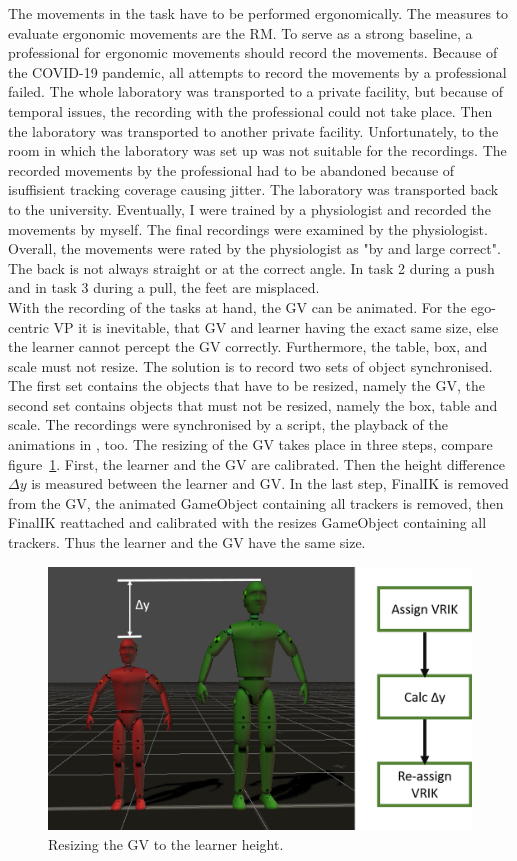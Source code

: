 The movements in the task have to be performed ergonomically. The measures to evaluate ergonomic movements are the RM. To serve as a strong baseline, a professional for ergonomic movements should record the movements. Because of the COVID-19 pandemic, all attempts to record the movements by a professional failed. The whole laboratory was transported to a private facility, but because of temporal issues, the recording with the professional could not take place. Then the laboratory was transported to another private facility. Unfortunately, to the room in which the laboratory was set up was not suitable for the recordings. The recorded movements by the professional had to be abandoned because of isuffisient tracking coverage causing jitter. The laboratory was transported back to the university. Eventually, I were trained by a physiologist and recorded the movements by myself. The final recordings were examined by the physiologist. Overall, the movements were rated by the physiologist as "by and large correct". The back is not always straight or at the correct angle. In task 2 during a push and in task 3 during a pull, the feet are misplaced.\\

With the recording of the tasks at hand, the GV can be animated. For the ego-centric VP it is inevitable, that GV and learner having the exact same size, else the learner cannot percept the GV correctly. Furthermore, the table, box, and scale must not resize. The solution is to record two sets of object synchronised. The first set contains the objects that have to be resized, namely the GV, the second set contains objects that must not be resized, namely the box, table and scale. The recordings were synchronised by a script, the playback of the animations in \exgo, too. The resizing of the GV takes place in three steps, compare figure~\ref{fig:resize}. First, the learner and the GV are calibrated. Then the height difference $\Delta y$ is measured between the learner and GV. In the last step, FinalIK is removed from the GV, the animated GameObject containing all trackers is removed, then FinalIK reattached and calibrated with the resizes GameObject containing all trackers. Thus the learner and the GV have the same size.
\begin{figure}[htb]
	\centering
	\includegraphics[width=\textwidth]{figures/resize.png}
	\caption[Resizing the GV to the learner height.]{Resizing the GV to the learner height.}
	\label{fig:resize}
\end{figure}


